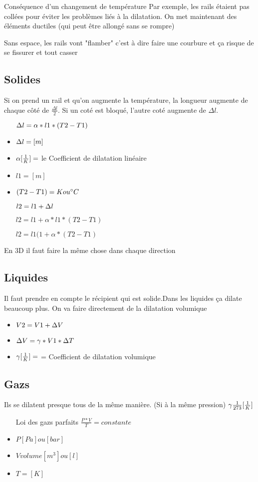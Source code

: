 
Conséquence d'un changement de température
Par exemple, les rails étaient pas collées pour éviter les problèmes liés à la dilatation. On met maintenant des éléments ductiles (qui peut être allongé sans se rompre)

Sans espace, les rails vont "flamber" c'est à dire faire une courbure et ça risque de se fissurer et tout casser

\subsection{Solides}
Si on prend un rail et qu'on augmente la température, la longueur augmente de chaque côté de $\frac{{\Delta}l}{2}$. Si un coté est bloqué, l'autre coté augmente de  ${\Delta}l$.

\begin{itemize}
    \item[$\dl = \alpha * l1 * (T2 - T1)$]
    \item $\dl = [m]$
    \item $\alpha [\dila]= $ le Coefficient de dilatation linéaire
    \item $l1 = [m]$
    \item $(T2 - T1) = K ou \celsius$
    \item[$l2 = l1 + \dl$]
    \item[$l2 = l1 + \alpha * l1 * (T2 - T1)$]
    \item[$l2 = l1 (1+\alpha*(T2-T1)$]
\end{itemize}

En 3D il faut faire la même chose dans chaque direction

\subsection{Liquides}
Il faut prendre en compte le récipient qui est solide.Dans les liquides ça dilate beaucoup plus. On va faire directement de la dilatation volumique

\begin{itemize}
    \item $V2 = V1 + \dV$
    \item $\dV = \gamma * V1 * \dT$
    \item $\gamma [\dila] =$ = Coefficient de dilatation volumique
\end{itemize}

\subsection{Gazs}
Ils se dilatent presque tous de la même manière. (Si à la même pression)
$\gamma \frac{1}{273} [\dila]$

\begin{itemize}
    \item[Loi des gazs parfaits] $\frac{P*V}{T} = constante$
    \item $P [Pa] ou [bar]$
    \item $V volume [m^3] ou [l]$
    \item $T = [K]$
\end{itemize}